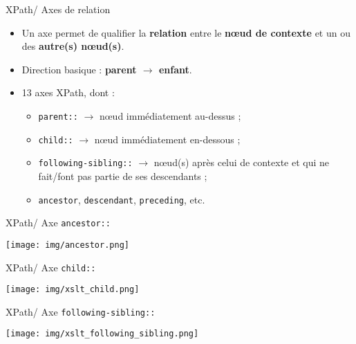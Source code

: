 \documentclass{beamer}
\begin{document}
        \begin{frame}{XPath/ Axes de relation}
        \Large
        \begin{itemize}
            \item Un axe permet de qualifier la \textbf{relation} entre le \textbf{n\oe ud de contexte} et un ou des \textbf{autre(s) n\oe ud(s)}.
            
            \item Direction basique : \textbf{parent $\rightarrow$ enfant}.

            \bigskip

            \item 13 axes XPath, dont :
            \begin{itemize}
            \large
                \item \texttt{parent::} $\rightarrow$ n\oe ud immédiatement au-dessus ;
                \item \texttt{child::} $\rightarrow$ n\oe ud immédiatement en-dessous ;
                \item \texttt{following-sibling::} $\rightarrow$ n\oe ud(s) après celui de contexte et qui ne fait/font pas partie de ses descendants ;
                \item \texttt{ancestor}, \texttt{descendant}, \texttt{preceding}, etc.
            \end{itemize}
        \end{itemize}
        
    \end{frame}

    \begin{frame}{XPath/ Axe \texttt{ancestor::}}
        \begin{center}
            \texttt{[image: img/ancestor.png]}
        \end{center}
    \end{frame}

    \begin{frame}{XPath/ Axe \texttt{child::}}
        \begin{center}
            \texttt{[image: img/xslt\_child.png]}
        \end{center}
    \end{frame}

    \begin{frame}{XPath/ Axe \texttt{following-sibling::}}
        \begin{center}
            \texttt{[image: img/xslt\_following\_sibling.png]}
        \end{center}
    \end{frame}
\end{document}
